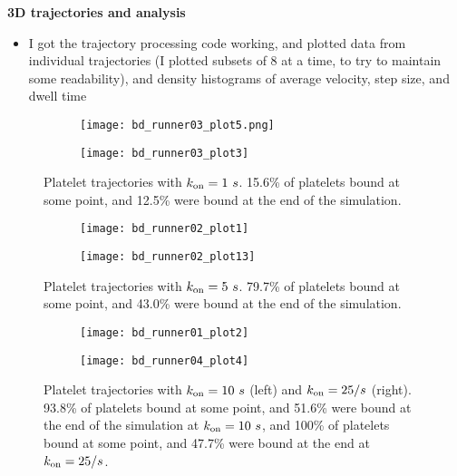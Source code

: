 \documentclass{article}
\newcommand{\tn}{\textnormal}
\begin{document}
\textbf{3D trajectories and analysis}

\begin{itemize}
\item I got the trajectory processing code working, and plotted data
  from individual trajectories (I plotted subsets of 8 at a time, to
  try to maintain some readability), and density histograms of average
  velocity, step size, and dwell time
\end{itemize}

\begin{figure}[h]
  \centering
  \begin{subfigure}{0.49\textwidth}
    \texttt{[image: bd\_runner03\_plot5.png]}
  \end{subfigure}
  \hfill
  \begin{subfigure}{0.49\textwidth}
    \texttt{[image: bd\_runner03\_plot3]}
  \end{subfigure}
  \caption{Platelet trajectories with $k_\tn{on} = 1 \ s$. 15.6\% of
    platelets bound at some point, and 12.5\% were bound at the end of
    the simulation.}
  \label{fig:traj03}
\end{figure}

\begin{figure}
  \centering
  \begin{subfigure}{0.49\textwidth}
    \texttt{[image: bd\_runner02\_plot1]}
  \end{subfigure}
  \hfill
  \begin{subfigure}{0.49\textwidth}
    \texttt{[image: bd\_runner02\_plot13]}
  \end{subfigure}  
  \caption{Platelet trajectories with $k_\tn{on} = 5 \ s$. 79.7\% of
    platelets bound at some point, and 43.0\% were bound at the end of
  the simulation.}
  \label{fig:traj02}
\end{figure}

\begin{figure}
  \centering
  \begin{subfigure}{0.49\textwidth}
    \texttt{[image: bd\_runner01\_plot2]}
  \end{subfigure}
  \hfill
  \begin{subfigure}{0.49\textwidth}
    \texttt{[image: bd\_runner04\_plot4]}
  \end{subfigure}  
  \caption{Platelet trajectories with $k_\tn{on} = 10 \ s$ (left) and
    $k_\tn{on} = 25 / s$ (right). 93.8\% of platelets bound at some
    point, and 51.6\% were bound at the end of the simulation at
    $k_\tn{on} = 10 \ s$, and 100\% of platelets bound at some point,
    and 47.7\% were bound at the end at $k_\tn{on} = 25 / s$.}
  \label{fig:traj14}
\end{figure}
\end{document}
